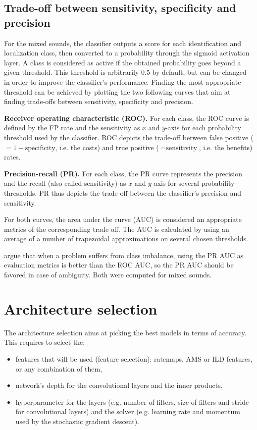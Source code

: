 \subsection{Trade-off between sensitivity, specificity and precision}
\label{methods:metrics:tradeoff}

For the mixed sounds, the classifier outputs a score for each identification and localization class, then converted to a probability through the sigmoid activation layer. A class is considered as active if the obtained probability goes beyond a given threshold. This threshold is arbitrarily $0.5$ by default, but can be changed in order to improve the classifier's performance. Finding the most appropriate threshold can be achieved by plotting the two following curves that aim at finding trade-offs between sensitivity, specificity and precision.

\textbf{Receiver operating characteristic (ROC).} For each class, the ROC curve is defined by the FP rate and the sensitivity as $x$ and $y$-axis for each probability threshold used by the classifier. ROC depicts the trade-off between false positive ($= 1 - \text{specificity}$, i.e. the costs) and true positive ($= \text{sensitivity}$, i.e. the benefits) rates.

\textbf{Precision-recall (PR).} For each class, the PR curve represents the precision and the recall (also called sensitivity) as $x$ and $y$-axis for several probability thresholds. PR thus depicts the trade-off between the classifier's precision and sensitivity.

For both curves, the area under the curve (AUC) is considered an appropriate metrics of the corresponding trade-off. The AUC is calculated by using an average of a number of trapezoidal approximations on several chosen thresholds.

\citeauthor{davis2006relationship} \parencite{davis2006relationship} argue that when a problem suffers from class imbalance, using the PR AUC as evaluation metrics is better than the ROC AUC, so the PR AUC should be favored in case of ambiguity. Both were computed for mixed sounds.


\section{Architecture selection}

The architecture selection aims at picking the best models in terms of accuracy. This requires to select the:%
\begin{itemize}
\itemsep-1em
\item features that will be used (feature selection): ratemaps, AMS or ILD features, or any combination of them,
\item network's depth for the convolutional layers and the inner products,
\item hyperparameter for the layers (e.g. number of filters, size of filters and stride for convolutional layers) and the solver (e.g. learning rate and momentum used by the stochastic gradient descent).
\end{itemize}

